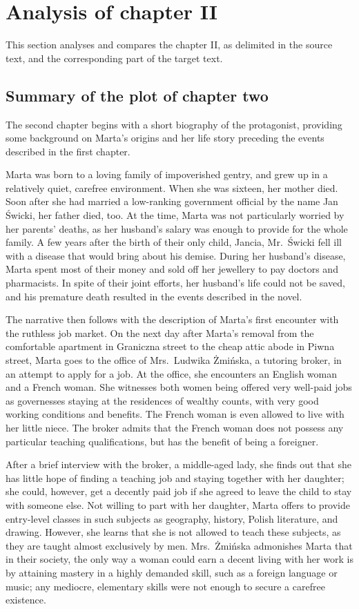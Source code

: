 \section{Analysis of chapter II}

This section analyses and compares the chapter II, as delimited in the source text, and the corresponding part of the target text.

\subsection{Summary of the plot of chapter two}

The second chapter begins with a short biography of the protagonist, providing some background on Marta's origins and her life story preceding the events described in the first chapter.

Marta was born to a loving family of impoverished gentry, and grew up in a relatively quiet, carefree environment.
When she was sixteen, her mother died.
Soon after she had married a low-ranking government official by the name Jan Świcki, her father died, too.
At the time, Marta was not particularly worried by her parents' deaths, as her husband's salary was enough to provide for the whole family.
A few years after the birth of their only child, Jancia, Mr.\ Świcki fell ill with a disease that would bring about his demise.
During her husband's disease, Marta spent most of their money and sold off her jewellery to pay doctors and pharmacists.
In spite of their joint efforts, her husband's life could not be saved, and his premature death resulted in the events described in the novel.

The narrative then follows with the description of Marta's first encounter with the ruthless job market.
On the next day after Marta's removal from the comfortable apartment in Graniczna street to the cheap attic abode in Piwna street, Marta goes to the office of Mrs.\ Ludwika Żmińska, a tutoring broker, in an attempt to apply for a job.
At the office, she encounters an English woman and a French woman.
She witnesses both women being offered very well-paid jobs as governesses staying at the residences of wealthy counts, with very good working conditions and benefits.
The French woman is even allowed to live with her little niece.
The broker admits that the French woman does not possess any particular teaching qualifications, but has the benefit of being a foreigner.

After a brief interview with the broker, a middle-aged lady, she finds out that she has little hope of finding a teaching job and staying together with her daughter; she could, however, get a decently paid job if she agreed to leave the child to stay with someone else.
Not willing to part with her daughter, Marta offers to provide entry-level classes in such subjects as geography, history, Polish literature, and drawing.
However, she learns that she is not allowed to teach these subjects, as they are taught almost exclusively by men.
Mrs.\ Żmińska admonishes Marta that in their society, the only way a woman could earn a decent living with her work is by attaining mastery in a highly demanded skill, such as a foreign language or music; any mediocre, elementary skills were not enough to secure a carefree existence.

